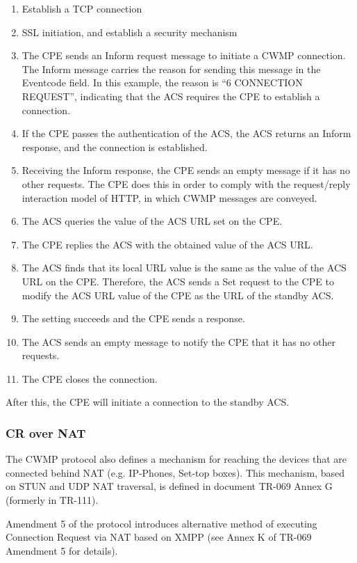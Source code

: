 \begin{enumerate}
  \item Establish a TCP connection
  \item SSL initiation, and establish a security mechanism
  \item The CPE sends an Inform request message to initiate a CWMP connection. The Inform message carries the reason for sending this message in the Eventcode field. In this example, the reason is “6 CONNECTION REQUEST”, indicating that the ACS requires the CPE to establish a connection.
  \item If the CPE passes the authentication of the ACS, the ACS returns an Inform response, and the connection is established.
  \item Receiving the Inform response, the CPE sends an empty message if it has no other requests. The CPE does this in order to comply with the request/reply interaction model of HTTP, in which CWMP messages are conveyed.
  \item The ACS queries the value of the ACS URL set on the CPE.
  \item The CPE replies the ACS with the obtained value of the ACS URL.
  \item The ACS finds that its local URL value is the same as the value of the ACS URL on the CPE. Therefore, the ACS sends a Set request to the CPE to modify the ACS URL value of the CPE as the URL of the standby ACS.
  \item The setting succeeds and the CPE sends a response.
  \item The ACS sends an empty message to notify the CPE that it has no other requests.
  \item The CPE closes the connection.
\end{enumerate}

After this, the CPE will initiate a connection to the standby ACS.

\subsubsection{CR over NAT}
The CWMP protocol also defines a mechanism for reaching the devices that are connected behind NAT (e.g. IP-Phones, Set-top boxes). This mechanism, based on STUN and UDP NAT traversal, is defined in document TR-069 Annex G (formerly in TR-111).

Amendment 5 of the protocol introduces alternative method of executing Connection Request via NAT based on XMPP (see Annex K of TR-069 Amendment 5 for details).


